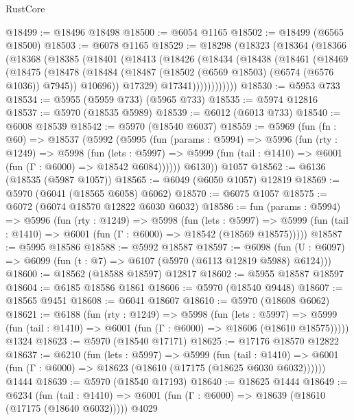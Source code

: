 \begin{lexlean}{RustCore}
\begin{coremodule}
@18499 := @18496 @18498
@18500 := @6054 @1165
@18502 := @18499 (@6565 @18500)
@18503 := @6078 @1165
@18529 := @18298
    (@18323
      (@18364
        (@18366
          (@18368
            (@18385
              (@18401
                (@18413
                  (@18426
                    (@18434
                      (@18438
                        (@18461
                          (@18469
                            (@18475
                              (@18478
                                (@18484
                                  (@18487 (@18502 (@6569 @18503) (@6574 (@6576 @1036)) @7945))
                                  @10696))
                              @17329)
                            @17341))))))))))))
@18530 := @5953 @733
@18534 := @5955 (@5959 @733) (@5965 @733)
@18535 := @5974 @12816
@18537 := @5970 (@18535 @5989)
@18539 := @6012 (@6013 @733)
@18540 := @6008 @18539
@18542 := @5970 (@18540 @6037)
@18559 := @5969
    (fun (fn : @60) =>
    @18537
      (@5992
        (@5995
          (fun (params : @5994) =>
          @5996
            (fun (rty : @1249) =>
            @5998
              (fun (lets : @5997) =>
              @5999 (fun (tail : @1410) => @6001 (fun (Γ : @6000) => @18542 @6084))))))
        @6130))
    @1057
@18562 := @6136 (@18535 (@5987 @1057))
@18565 := @6049 (@6050 @1057) @12819
@18569 := @5970 (@6041 (@18565 @6058) @6062)
@18570 := @6075 @1057
@18575 := @6072 (@6074 @18570 @12822 @6030 @6032)
@18586 := fun (params : @5994) =>
  @5996
    (fun (rty : @1249) =>
    @5998
      (fun (lets : @5997) =>
      @5999 (fun (tail : @1410) => @6001 (fun (Γ : @6000) => @18542 (@18569 @18575)))))
@18587 := @5995 @18586
@18588 := @5992 @18587
@18597 := @6098
    (fun (U : @6097) => @6099 (fun (t : @7) => @6107 (@5970 (@6113 @12819 @5988) @6124)))
@18600 := @18562 (@18588 @18597) @12817
@18602 := @5955 @18587 @18597
@18604 := @6185 @18586 @1861
@18606 := @5970 (@18540 @9448)
@18607 := @18565 @9451
@18608 := @6041 @18607
@18610 := @5970 (@18608 @6062)
@18621 := @6188
    (fun (rty : @1249) =>
    @5998
      (fun (lets : @5997) =>
      @5999 (fun (tail : @1410) => @6001 (fun (Γ : @6000) => @18606 (@18610 @18575)))))
    @1324
@18623 := @5970 (@18540 @17171)
@18625 := @17176 @18570 @12822
@18637 := @6210
    (fun (lets : @5997) =>
    @5999
      (fun (tail : @1410) =>
      @6001 (fun (Γ : @6000) => @18623 (@18610 (@17175 (@18625 @6030 @6032))))))
    @1444
@18639 := @5970 (@18540 @17193)
@18640 := @18625 @1444
@18649 := @6234
    (fun (tail : @1410) => @6001 (fun (Γ : @6000) => @18639 (@18610 (@17175 (@18640 @6032)))))
    @4029

\end{coremodule}
\end{lexlean}
